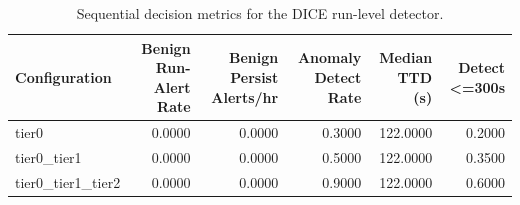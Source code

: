 \begin{table}[t]
\centering
\caption{Sequential decision metrics for the DICE run-level detector.}
\label{tab:dice_sequential_metrics}
\footnotesize
\begin{tabular}{lrrrrr}
\toprule
Configuration & Benign Run-Alert Rate & Benign Persist Alerts/hr & Anomaly Detect Rate & Median TTD (s) & Detect <=300s \\
\midrule
tier0 & 0.0000 & 0.0000 & 0.3000 & 122.0000 & 0.2000 \\
tier0_tier1 & 0.0000 & 0.0000 & 0.5000 & 122.0000 & 0.3500 \\
tier0_tier1_tier2 & 0.0000 & 0.0000 & 0.9000 & 122.0000 & 0.6000 \\
\bottomrule
\end{tabular}

\end{table}
